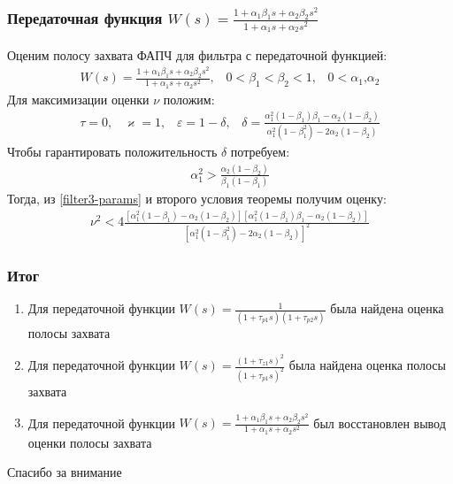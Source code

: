 \documentclass{beamer}
\begin{document}
\begin{frame}
\frametitle{Передаточная функция $W(s) = \frac{1+\alpha_1\beta_1s + \alpha_2\beta_2s^2}{1+\alpha_1s + \alpha_2s^2}$}
Оценим полосу захвата ФАПЧ для фильтра с передаточной функцией:\vspace{-1mm}
 \begin{equation}\label{filter3}
 \begin{aligned}
W(s) = \frac{1+\alpha_1\beta_1s + \alpha_2\beta_2s^2}{1+\alpha_1s + \alpha_2s^2} \text{,}\quad 0 < \beta_1 < \beta_2 < 1 \text{,}\quad 0 < \alpha_1 \text{,} \alpha_2
 \end{aligned}
\end{equation}
Для максимизации оценки $\nu$ положим:
\vspace{-2mm}
 \begin{equation}\label{filter3-params}
 \begin{aligned}
 \tau = 0 \text{,} \quad
 \varkappa = 1 \text{,} \quad
 \varepsilon = 1-\delta \text{,} \quad
 \delta = \frac{\alpha_1^2(1-\beta_1)\beta_1 - \alpha_2(1-\beta_2)}{\alpha_1^2(1-\beta_1^2) - 2\alpha_2(1-\beta_2)}
 \end{aligned}
\end{equation}
Чтобы гарантировать положительность $\delta$ потребуем:\vspace{-2mm}
 \begin{equation}
 \begin{aligned}
\alpha_1^2 > \frac{\alpha_2(1-\beta_2)}{\beta_1(1-\beta_1)}
 \end{aligned}
\end{equation}
Тогда, из \eqref{filter3-params} и второго условия теоремы получим оценку:
 \begin{equation*}
 \begin{aligned}
\nu^2 < 4\frac{[\alpha_1^2(1-\beta_1) - \alpha_2(1-\beta_2)][\alpha_1^2(1-\beta_1)\beta_1 - \alpha_2(1-\beta_2)]}{[\alpha_1^2(1-\beta_1^2) - 2\alpha_2(1-\beta_2)]^2}
 \end{aligned}
 \end{equation*}
\end{frame}


\begin{frame}
\frametitle{Итог}
\begin{enumerate}
\item Для передаточной функции $W(s) = \frac{1}{(1+\tau_{p1}s)(1+\tau_{p2}s)}$
была найдена оценка полосы захвата
\item Для передаточной функции $W(s) = \frac{(1+\tau_{z1}s)^2}{(1+\tau_{p1}s)^2}$
была найдена оценка полосы захвата
\item Для передаточной функции $W(s) = \frac{1+\alpha_1\beta_1s + \alpha_2\beta_2s^2}{1+\alpha_1s + \alpha_2s^2}$ был восстановлен вывод оценки полосы захвата
\end{enumerate}
\end{frame}


\begin{frame}
\Huge{\centerline{Спасибо за внимание}}
\end{frame}

\end{document}
